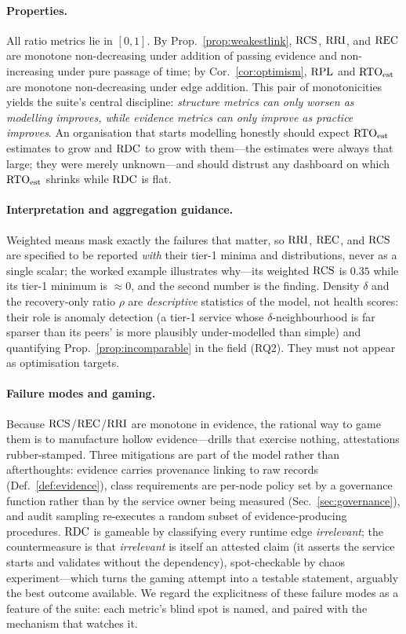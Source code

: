 \paragraph{Properties.} All ratio metrics lie in $[0,1]$. By Prop.~\ref{prop:weakestlink}, $\mathrm{RCS}$, $\mathrm{RRI}$, and $\mathrm{REC}$ are monotone non-decreasing under addition of passing evidence and non-increasing under pure passage of time; by Cor.~\ref{cor:optimism}, $\mathrm{RPL}$ and $\mathrm{RTO}_{\mathrm{est}}$ are monotone non-decreasing under edge addition. This pair of monotonicities yields the suite's central discipline: \emph{structure metrics can only worsen as modelling improves, while evidence metrics can only improve as practice improves}. An organisation that starts modelling honestly should expect $\mathrm{RTO}_{\mathrm{est}}$ estimates to grow and $\mathrm{RDC}$ to grow with them---the estimates were always that large; they were merely unknown---and should distrust any dashboard on which $\mathrm{RTO}_{\mathrm{est}}$ shrinks while $\mathrm{RDC}$ is flat.

\paragraph{Interpretation and aggregation guidance.} Weighted means mask exactly the failures that matter, so $\mathrm{RRI}$, $\mathrm{REC}$, and $\mathrm{RCS}$ are specified to be reported \emph{with} their tier-1 minima and distributions, never as a single scalar; the worked example illustrates why---its weighted $\mathrm{RCS}$ is $0.35$ while its tier-1 minimum is $\approx 0$, and the second number is the finding. Density $\delta$ and the recovery-only ratio $\rho$ are \emph{descriptive} statistics of the model, not health scores: their role is anomaly detection (a tier-1 service whose $\delta$-neighbourhood is far sparser than its peers' is more plausibly under-modelled than simple) and quantifying Prop.~\ref{prop:incomparable} in the field (RQ2). They must not appear as optimisation targets.

\paragraph{Failure modes and gaming.} Because $\mathrm{RCS}$/$\mathrm{REC}$/$\mathrm{RRI}$ are monotone in evidence, the rational way to game them is to manufacture hollow evidence---drills that exercise nothing, attestations rubber-stamped. Three mitigations are part of the model rather than afterthoughts: evidence carries provenance linking to raw records (Def.~\ref{def:evidence}), class requirements are per-node policy set by a governance function rather than by the service owner being measured (Sec.~\ref{sec:governance}), and audit sampling re-executes a random subset of evidence-producing procedures. $\mathrm{RDC}$ is gameable by classifying every runtime edge \emph{irrelevant}; the countermeasure is that \emph{irrelevant} is itself an attested claim (it asserts the service starts and validates without the dependency), spot-checkable by chaos experiment---which turns the gaming attempt into a testable statement, arguably the best outcome available. We regard the explicitness of these failure modes as a feature of the suite: each metric's blind spot is named, and paired with the mechanism that watches it.
